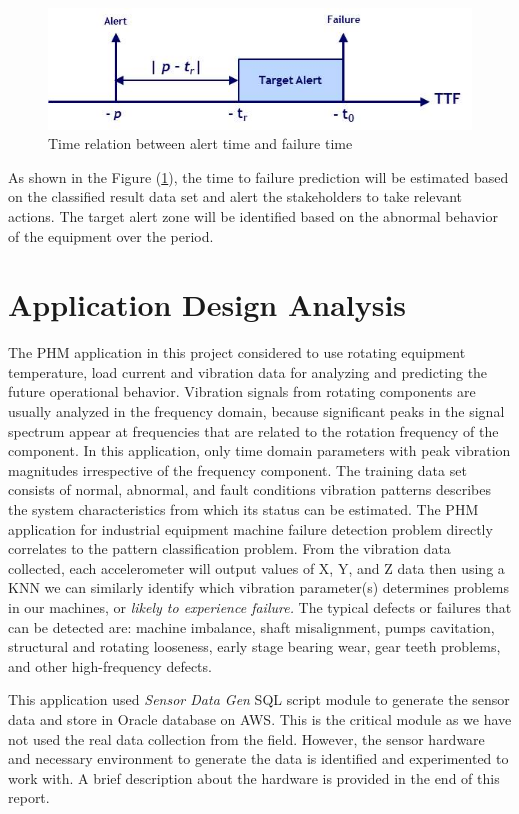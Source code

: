 \documentclass[sigconf]{acmart}
\begin{document}
\begin{figure}
\includegraphics[width=1.0\columnwidth]{images/ttf_1}
\caption{Time relation between alert time and failure time} \label{fig:Figure3}
\end{figure}

As shown in the Figure (\ref{fig:Figure3}), the time to failure prediction will be estimated based on the classified result data set and alert the stakeholders to take relevant actions. The target alert zone will be identified based on the abnormal behavior of the equipment over the period.

\section{Application Design Analysis}
The PHM application in this project considered to use rotating equipment temperature, load current and vibration data for analyzing and predicting the future operational behavior. 
Vibration signals from rotating components are usually analyzed in the frequency domain, because significant peaks in the signal spectrum appear at frequencies that are related to the rotation frequency of the component. In this application, only time domain parameters with peak vibration magnitudes irrespective of the frequency component. The training data set consists of normal, abnormal, and fault conditions vibration patterns describes the system characteristics from which its status can be estimated.
The PHM application for industrial equipment machine failure detection problem directly correlates to the pattern classification problem. From the vibration data collected, each accelerometer will output values of X, Y, and Z data then using a KNN we can similarly identify which vibration parameter(s) determines problems in our machines, or \textit{likely to experience failure.} The typical defects or failures that can be detected are: machine imbalance, shaft misalignment, pumps cavitation, structural and rotating looseness, early stage bearing wear, gear teeth problems, and other high-frequency defects.

This application used \textit{Sensor Data Gen} SQL script module to generate the sensor data and store in Oracle database on AWS. This is the critical module as we have not used the real data collection from the field. However, the sensor hardware and necessary environment to generate the data is identified and experimented to work with. A brief description about the hardware is provided in the end of this report.
\end{document}
